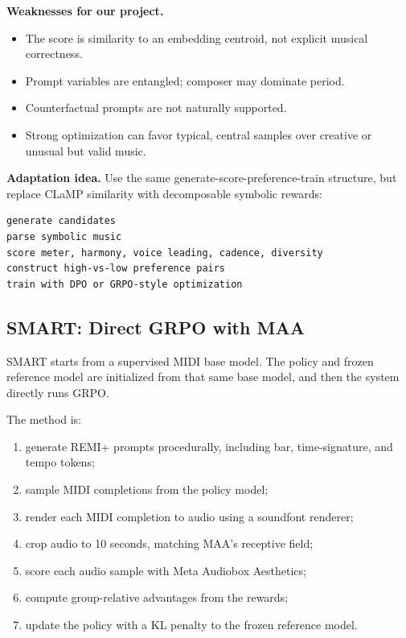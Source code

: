 \documentclass[11pt]{article}
\begin{document}
\textbf{Weaknesses for our project.}
\begin{itemize}[leftmargin=*]
  \item The score is similarity to an embedding centroid, not explicit musical
  correctness.
  \item Prompt variables are entangled; composer may dominate period.
  \item Counterfactual prompts are not naturally supported.
  \item Strong optimization can favor typical, central samples over creative or
  unusual but valid music.
\end{itemize}

\textbf{Adaptation idea.}
Use the same generate-score-preference-train structure, but replace CLaMP
similarity with decomposable symbolic rewards:

\begin{verbatim}
generate candidates
parse symbolic music
score meter, harmony, voice leading, cadence, diversity
construct high-vs-low preference pairs
train with DPO or GRPO-style optimization
\end{verbatim}

\subsection{SMART: Direct GRPO with MAA}

SMART starts from a supervised MIDI base model. The policy and frozen reference
model are initialized from that same base model, and then the system directly
runs GRPO.

The method is:

\begin{enumerate}[leftmargin=*]
  \item generate REMI+ prompts procedurally, including bar, time-signature, and
  tempo tokens;
  \item sample MIDI completions from the policy model;
  \item render each MIDI completion to audio using a soundfont renderer;
  \item crop audio to 10 seconds, matching MAA's receptive field;
  \item score each audio sample with Meta Audiobox Aesthetics;
  \item compute group-relative advantages from the rewards;
  \item update the policy with a KL penalty to the frozen reference model.
\end{enumerate}
\end{document}
